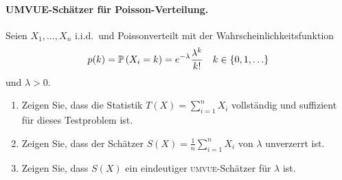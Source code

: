 \paragraph{UMVUE-Schätzer für Poisson-Verteilung. } Seien $X_1, \ldots, X_n$ i.i.d.\ 
und Poissonverteilt mit der Wahrscheinlichkeitsfunktion
\begin{equation*}
    p(k) = \mathbb P \left( X_i = k \right) = e^{-\lambda} \frac{\lambda^k}{ k!} \quad k \in \left\{ 0,1, \ldots \right\}
\end{equation*}
und $\lambda>0$.
\begin{enumerate}
    \item Zeigen Sie, dass die Statistik $T\left( X \right) = \sum_{i=1}^{n}
        X_i$ vollständig und suffizient für dieses Testproblem ist.
    \item Zeigen Sie, dass der Schätzer $S\left( X \right) = \frac{1}{n}
        \sum_{i=1}^{n} X_i$ von $\lambda$ unverzerrt ist.
    \item Zeigen Sie, dass $S(X)$ ein eindeutiger \textsc{umvue}-Schätzer für
        $\lambda$ ist.
\end{enumerate} 

